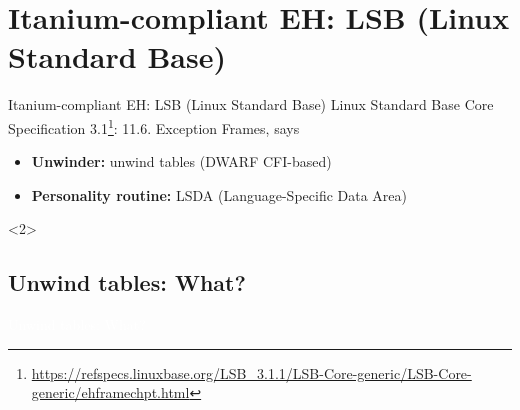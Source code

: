 \section{Itanium-compliant EH: LSB (Linux Standard Base)}
\begin{frame}{Itanium-compliant EH: LSB (Linux Standard Base)}
  \alert{Linux Standard Base Core Specification 3.1}\footnote{\url{https://refspecs.linuxbase.org/LSB_3.1.1/LSB-Core-generic/LSB-Core-generic/ehframechpt.html}}: 11.6. Exception Frames, says
  \begin{itemize}
  \item \textbf{Unwinder:} unwind tables (DWARF CFI-based)

  \item \textbf{Personality routine:} LSDA (Language-Specific Data Area)
  \end{itemize}

  \begin{onlyenv}<2>
    \TZoverlayLayer{}{\fontsize{32}{32}\selectfont\pill}
  \end{onlyenv}
\end{frame}

\subsection{Unwind tables: What?}
           {
             \begin{frame}
               \centering
               \vfill\textcolor{white}{\Large Unwind tables: What?}\vfill
             \end{frame}
           }

